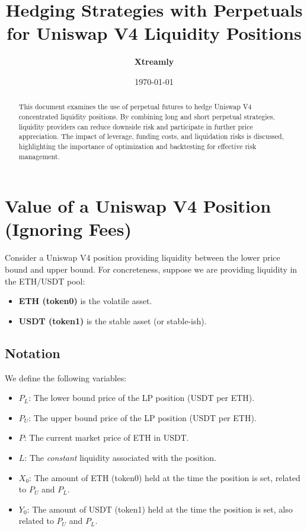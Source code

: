 \documentclass[12pt]{article}
\begin{document}
\title{\textbf{Hedging Strategies with Perpetuals for Uniswap V4 Liquidity Positions}}
\author{%
  \textbf{Xtreamly}%
}
\date{\today}
\maketitle

\begin{abstract}
This document examines the use of perpetual futures to hedge Uniswap V4 concentrated liquidity positions. By combining long and short perpetual strategies, liquidity providers can reduce downside risk and participate in further price appreciation. The impact of leverage, funding costs, and liquidation risks is discussed, highlighting the importance of optimization and backtesting for effective risk management.
\end{abstract}

\section{Value of a Uniswap V4 Position (Ignoring Fees)}
\label{sec:uniswaplp}

Consider a Uniswap V4 position providing liquidity between the lower price bound and upper bound. For concreteness, suppose we are providing liquidity in the ETH/USDT pool:
\begin{itemize}
    \item \textbf{ETH (token0)} is the volatile asset.
    \item \textbf{USDT (token1)} is the stable asset (or stable-ish).
\end{itemize}

\subsection{Notation}
We define the following variables:
\begin{itemize}
    \item $P_L$: The lower bound price of the LP position (USDT per ETH).
    \item $P_U$: The upper bound price of the LP position (USDT per ETH).
    \item $P$: The current market price of ETH in USDT.
    \item $L$: The \emph{constant} liquidity associated with the position.
    \item $X_0$: The amount of ETH (token0) held at the time the position is set, related to $P_U$ and $P_L$.
    \item $Y_0$: The amount of USDT (token1) held at the time the position is set, also related to $P_U$ and $P_L$.
\end{itemize}
\end{document}
